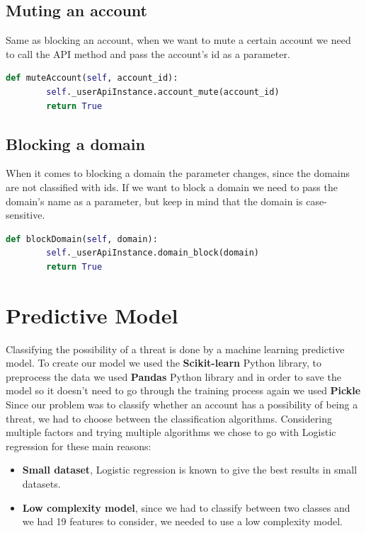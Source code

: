 \subsection{Muting an account}
Same as blocking an account, when we want to mute a certain account we need to call the API method and pass the account's id as a parameter.
\\[5pt]
\begin{lstlisting}[language=python, caption={Muting an account method}, captionpos=b]
	def muteAccount(self, account_id):
		self._userApiInstance.account_mute(account_id)
		return True
\end{lstlisting}
\subsection{Blocking a domain}
When it comes to blocking a domain the parameter changes, since the domains are not classified with ids. If we want to block a domain we need to pass the domain's name as a parameter, but keep in mind that the domain is case-sensitive.
\\[5pt]
\begin{lstlisting}[language=python, caption={Blockin a domain method}, captionpos=b]
	def blockDomain(self, domain):
		self._userApiInstance.domain_block(domain)
		return True
\end{lstlisting}

\section{Predictive Model}\label{s:model}
Classifying the possibility of a threat is done by a machine learning predictive model.
To create our model we used the \textbf{Scikit-learn} \cite{scikit-learn} Python library, to
preprocess the data we used \textbf{Pandas} \cite{pandas} Python library and in order to save the
model so it doesn't need to go through the training process again we used \textbf{Pickle} \cite{pickle}
\\[5pt]
Since our problem was to classify whether an account has a possibility of being a threat,
we had to choose between the classification algorithms. Considering multiple factors and trying
multiple algorithms we chose to go with Logistic regression for these main reasons:
\begin{itemize}
	\item \textbf{Small dataset}, Logistic regression is known to give the best results in small datasets.
	\item \textbf{Low complexity model}, since we had to classify between two classes and we had 19 features to consider,
	we needed to use a low complexity model.
\end{itemize}
